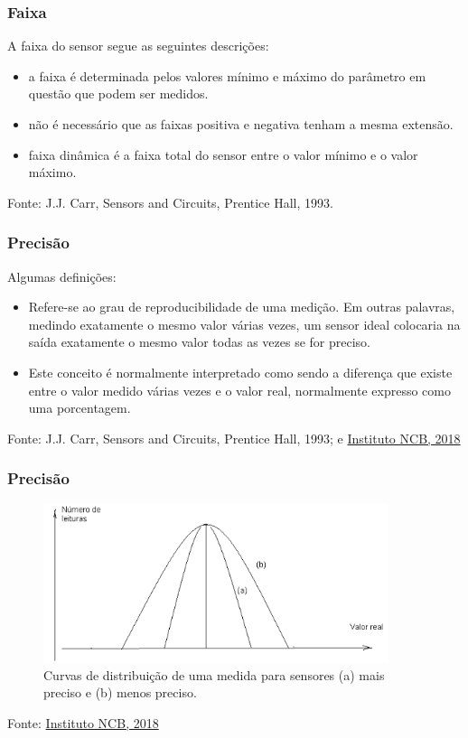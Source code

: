 \documentclass[t]{beamer}
\begin{document}
\begin{frame}
	\frametitle{Faixa}
	A faixa do sensor segue as seguintes descrições:
	\begin{itemize}
		\item a faixa é determinada pelos valores mínimo e máximo do parâmetro em questão que podem ser medidos.
		\item não é necessário que as faixas positiva e negativa tenham a mesma extensão.
		\item faixa dinâmica é a faixa total do sensor entre o valor mínimo e o valor máximo.
	\end{itemize}
	{\scriptsize Fonte: J.J. Carr, Sensors and Circuits, Prentice Hall, 1993.}
\end{frame}

\begin{frame}
	\frametitle{Precisão}
	Algumas definições:
	\begin{itemize}
		\item  Refere-se ao grau de reproducibilidade de uma medição. Em outras palavras, medindo exatamente o mesmo valor várias vezes, um sensor ideal colocaria na saída exatamente o mesmo valor todas as vezes se for preciso.
		\item Este conceito é normalmente interpretado como sendo a diferença que existe entre o valor medido várias vezes e o valor real, normalmente expresso como uma porcentagem.
	\end{itemize}
	\bigskip
	{\scriptsize Fonte: J.J. Carr, Sensors and Circuits, Prentice Hall, 1993; e  \href{http://www.newtoncbraga.com.br/index.php/eletronica/52-artigos-diversos/4888-art645}{Instituto NCB, 2018}} 
\end{frame}

\begin{frame}
	\frametitle{Precisão}
	\begin{figure}
		\includegraphics[width=0.9\textwidth]{precisao}
		\caption{Curvas de distribuição de uma medida para sensores (a) mais preciso e (b) menos preciso.}
	\end{figure}
	{\scriptsize Fonte: \href{http://www.newtoncbraga.com.br/index.php/eletronica/52-artigos-diversos/4888-art645}{Instituto NCB, 2018}}
\end{frame}
\end{document}
